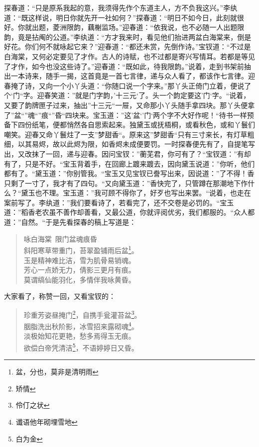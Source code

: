 \documentclass[12pt,oneside]{book}
\newenvironment{shici}{%
\begin{verse}%
\centering\large\hspace{12pt}}%
{\end{verse}}
\begin{document}
探春道：“只是原系我起的意，我须得先作个东道主人，方不负我这兴。”李纨道：“既这样说，明日你就先开一社如何？”探春道：“明日不如今日，此刻就很好。你就出题，菱洲限韵，藕榭监场。”迎春道：“依我说，也不必随一人出题限韵，竟是拈阄的公道。”李纨道：“方才我来时，看见他们抬进两盆白海棠来，倒是好花。你们何不就咏起它来？”迎春道：“都还未赏，先倒作诗。”宝钗道：“不过是白海棠，又何必定要见了才作。古人的诗赋，也不过都是寄兴写情耳。若都是等见了才作，如今也没这些诗了。”迎春道：“既如此，待我限韵。”说着，走到书架前抽出一本诗来，随手一揭，这首竟是一首七言律，递与众人看了，都该作七言律。迎春掩了诗，又向一个小丫头道：“你随口说一个字来。”那丫头正倚门立着，便说了个‘门“字。迎春笑道：”就是门字韵，’十三元‘了。头一个韵定要这’门‘字。“说着，又要了韵牌匣子过来，抽出”十三元“一屉，又命那小丫头随手拿四块。那丫头便拿了”盆“”魂“”痕“”昏“四块来。宝玉道：”这’盆‘’门‘两个字不大好作呢！“待书一样预备下四份纸笔，便都悄然各自思索起来。独黛玉或抚梧桐，或看秋色，或和丫鬟们嘲笑。迎春又命丫鬟炷了一支”梦甜香“。原来这”梦甜香“只有三寸来长，有灯草粗细，以其易烬，故以此烬为限，如香烬未成便要罚。一时探春便先有了，自提笔写出，又改抹了一回，递与迎春。因问宝钗：”蘅芜君，你可有了？“宝钗道：”有却有了，只是不好。“宝玉背着手，在回廊上踱来踱去，因向黛玉说道：”你听，他们都有了。“黛玉道：”你别管我。“宝玉又见宝钗已誊写出来，因说道：”了不得！香只剩了一寸了，我才有了四句。“又向黛玉道：”香快完了，只管蹲在那潮地下作什么？“黛玉也不理。宝玉道：”我可顾不得你了，好歹也写出来罢。“说着，也走在案前写了。李纨道：”我们要看诗了，若看完了，还不交卷是必罚的。“宝玉道：”稻香老农虽不善作却善看，又最公道，你就评阅优劣，我们都服的。“众人都道：”自然。“于是先看探春的稿上写道是：

\begin{shici}
咏白海棠~限门盆魂痕昏\\
斜阳寒草带重门，苔翠盈铺雨后盆\footnote{盆，分也，莫非是清明雨}。\\
玉是精神难比洁，雪为肌骨易销魂。\\
芳心一点娇无力，倩影三更月有痕。\\
莫谓缟仙能羽化，多情伴我咏黄昏。
\end{shici}

大家看了，称赞一回，又看宝钗的：

\begin{shici}
珍重芳姿昼掩门\footnote{矫情}，自携手瓮灌苔盆\footnote{伶仃之状}。\\
胭脂洗出秋阶影，冰雪招来露砌魂\footnote{谶语他年砌埋雪地}。\\
淡极始知花更艳，愁多焉得玉无痕。\\
欲偿白帝凭清洁\footnote{白为金}，不语婷婷日又昏。
\end{shici}
\end{document}
